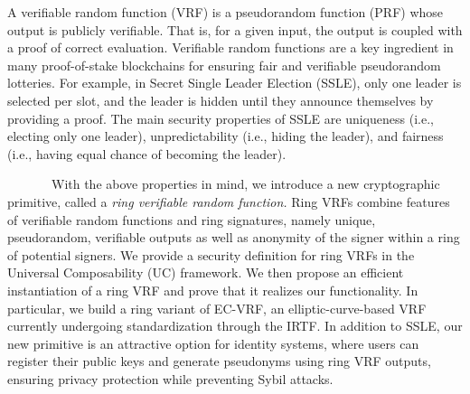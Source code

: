 

\def\eprintsmallskip{\smallskip}{}%
 A verifiable random function (VRF) is a pseudorandom function (PRF) whose output is publicly verifiable.
That is, for a given input, the output is coupled with a proof of correct evaluation.
Verifiable random functions are a key ingredient in many proof-of-stake blockchains for ensuring fair and verifiable pseudorandom lotteries.
For example, in Secret Single Leader Election (SSLE), only one leader is selected per slot, and the
leader is hidden until they announce themselves by providing a proof.
The main security properties of SSLE are uniqueness (i.e., electing only one leader), unpredictability (i.e., hiding the leader), and fairness (i.e., having equal chance of becoming the leader).

~~~~~~~With the above properties in mind, we introduce a new cryptographic primitive, called a 
\emph{ring verifiable random function.}
Ring VRFs combine features of verifiable random functions and ring signatures, namely unique, pseudorandom, verifiable outputs as well as anonymity of the signer within a ring of potential signers.
We provide a security definition for ring VRFs in the Universal Composability (UC) framework.
We then propose an efficient instantiation of a ring VRF and prove that it realizes our functionality.
In particular, we build a ring variant of EC-VRF, an elliptic-curve-based VRF currently undergoing standardization through the IRTF.
In addition to SSLE, our new primitive is an attractive option for identity systems, where users can register their public keys and generate pseudonyms using ring VRF outputs, ensuring privacy protection while preventing Sybil attacks.

